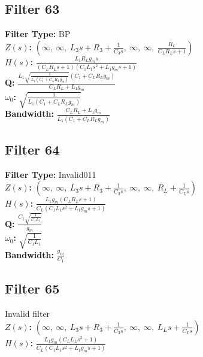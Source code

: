 \documentclass{article}
\begin{document}
\subsection*{Filter 63}
\textbf{Filter Type:} BP \\ 
\textbf{$Z(s)$:} $\left( \infty, \  \infty, \  L_{3} s + R_{3} + \frac{1}{C_{3} s}, \  \infty, \  \infty, \  \frac{R_{L}}{C_{L} R_{L} s + 1}\right)$ \\ 
\textbf{$H(s)$:} $\frac{L_{1} R_{L} g_{m} s}{\left(C_{L} R_{L} s + 1\right) \left(C_{1} L_{1} s^{2} + L_{1} g_{m} s + 1\right)}$ \\ 
\textbf{Q:} $\frac{L_{1} \sqrt{\frac{1}{L_{1} \left(C_{1} + C_{L} R_{L} g_{m}\right)}} \left(C_{1} + C_{L} R_{L} g_{m}\right)}{C_{L} R_{L} + L_{1} g_{m}}$ \\ 
\textbf{$\omega_0$:} $\sqrt{\frac{1}{L_{1} \left(C_{1} + C_{L} R_{L} g_{m}\right)}}$ \\ 
\textbf{Bandwidth:} $\frac{C_{L} R_{L} + L_{1} g_{m}}{L_{1} \left(C_{1} + C_{L} R_{L} g_{m}\right)}$ \\ 
\subsection*{Filter 64}
\textbf{Filter Type:} Invalid011 \\ 
\textbf{$Z(s)$:} $\left( \infty, \  \infty, \  L_{3} s + R_{3} + \frac{1}{C_{3} s}, \  \infty, \  \infty, \  R_{L} + \frac{1}{C_{L} s}\right)$ \\ 
\textbf{$H(s)$:} $\frac{L_{1} g_{m} \left(C_{L} R_{L} s + 1\right)}{C_{L} \left(C_{1} L_{1} s^{2} + L_{1} g_{m} s + 1\right)}$ \\ 
\textbf{Q:} $\frac{C_{1} \sqrt{\frac{1}{C_{1} L_{1}}}}{g_{m}}$ \\ 
\textbf{$\omega_0$:} $\sqrt{\frac{1}{C_{1} L_{1}}}$ \\ 
\textbf{Bandwidth:} $\frac{g_{m}}{C_{1}}$ \\ 
\subsection*{Filter 65}
Invalid filter \\ 
\textbf{$Z(s)$:} $\left( \infty, \  \infty, \  L_{3} s + R_{3} + \frac{1}{C_{3} s}, \  \infty, \  \infty, \  L_{L} s + \frac{1}{C_{L} s}\right)$ \\ 
\textbf{$H(s)$:} $\frac{L_{1} g_{m} \left(C_{L} L_{L} s^{2} + 1\right)}{C_{L} \left(C_{1} L_{1} s^{2} + L_{1} g_{m} s + 1\right)}$ \\ 
\end{document}

